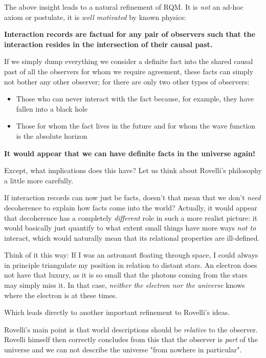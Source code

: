 \documentclass{article}
\begin{document}
The above insight leads to a natural refinement of RQM. It is \textit{not} an ad-hoc axiom or postulate, it is \textit{well motivated} by known physics:

\textbf{Interaction records are factual for any pair of observers such that the interaction resides in the intersection of their causal past.}

If we simply dump everything we consider a definite fact into the shared causal past of all the observers for whom we require agreement, these facts can simply not bother any other observer; for there are only two other types of observers:

\begin{itemize}
\item Those who can never interact with the fact because, for example, they have fallen into a black hole  
\item Those for whom the fact lives in the future and for whom the wave function is the absolute horizon
\end{itemize}

\textbf{It would appear that we can have definite facts in the universe again!}

Except, what implications does this have? Let us think about Rovelli's philosophy a little more carefully.

If interaction records can now just be facts, doesn't that mean that we don't \textit{need} decoherence to explain how facts come into the world? Actually, it would appear that decoherence has a completely \textit{different} role in such a more realist picture: it would basically just quantify to what extent small things have more ways \textit{not to} interact, which would naturally mean that its relational properties are ill-defined.

Think of it this way: If I was an astronaut floating through space, I could always in principle triangulate my position in relation to distant stars. An electron does not have that luxury, as it is so small that the photons coming from the stars may simply miss it. In that case, \textit{neither the electron nor the universe} knows where the electron is at these times.

Which leads directly to another important refinement to Rovelli's ideas.

Rovelli's main point is that world descriptions should be \textit{relative} to the observer. Rovelli himself then correctly concludes from this that the observer is \textit{part} of the universe and we can not describe the universe "from nowhere in particular".
\end{document}
